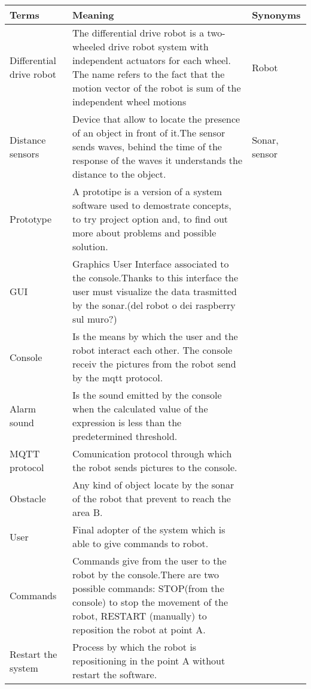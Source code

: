 \documentclass[a4paper]{article}
\begin{document}
\begin{tabular}{ | m{2cm} | m{10cm}| m{2cm} | }
    \hline
	Terms&Meaning&Synonyms\\ 
	\hline
	Differential drive robot& The differential drive robot is a two-wheeled drive robot system with independent actuators for each wheel. The name refers to the fact that the motion vector of the robot is sum of the independent wheel motions&Robot\\ 
	\hline
	Distance sensors&Device that allow to locate the presence of an object in front of it.The sensor sends waves, behind the time of the response of the waves it understands the distance to the object.&Sonar, sensor\\
	\hline
	Prototype&A prototipe is a version of a system software used to demostrate concepts, to try project option and, to find out more about problems and possible solution.&\\
	\hline
	GUI&Graphics User Interface associated to the console.Thanks to this interface the user must visualize the data trasmitted by the sonar.(del robot o dei raspberry sul muro?) & \\
	\hline
	Console&Is the means by which the user and the robot interact each other. The console receiv the pictures from the robot send by the mqtt protocol.&\\
	\hline
	Alarm sound&Is the sound emitted by the console when the calculated value of the expression is less than the predetermined threshold.&\\
	\hline
	MQTT protocol&Comunication protocol through which the robot sends pictures to the console.&\\
	\hline
	Obstacle&Any kind of object locate by the sonar of the robot that prevent to reach the area B.&\\
	\hline
	User&Final adopter of the system which is able to give commands to robot.&\\
	\hline
	Commands&Commands give from the user to the robot by the console.There are two possible commands: STOP(from the console) to stop the movement of the robot, RESTART (manually) to reposition the robot at point A.&\\
	\hline
	Restart the system&Process by which the robot is repositioning in the point A without restart the software.&\\
	\hline 
\end{tabular}

\end{document}
